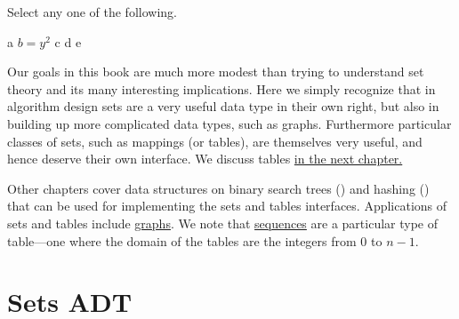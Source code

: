 \begin{gram}[10][Choices]
Select any one of the following.
\begin{anychoice}
\choice a
\choice $b = y^2$
\choice* c
\choice* d
\choice e
\end{anychoice}
\end{gram}

\begin{gram}[ 20  ] [ x]
\label{xy}
Our goals in this book are much more modest than trying to understand set theory and its many interesting implications.  Here we simply recognize that in algorithm design sets are a very useful data type in their own right, but also in building up more complicated data types, such as graphs.  Furthermore particular classes of sets, such as mappings (or tables), are themselves very useful, and hence deserve their own interface. 
%
We discuss tables \href{ch:tables}{in the next chapter.}

\end{gram}

\begin{gram}
Other chapters cover data structures on binary search trees
() and hashing () that can be used for
implementing the sets and tables interfaces. 
%
Applications of sets and tables include \href{ch:graphs::graphs}{graphs}.
%
We note that \href{ch:sequences::adt}{sequences} are a particular type of table---one where the domain of the tables are the integers from $0$ to $n-1$.  
\end{gram}



\section{Sets ADT}

